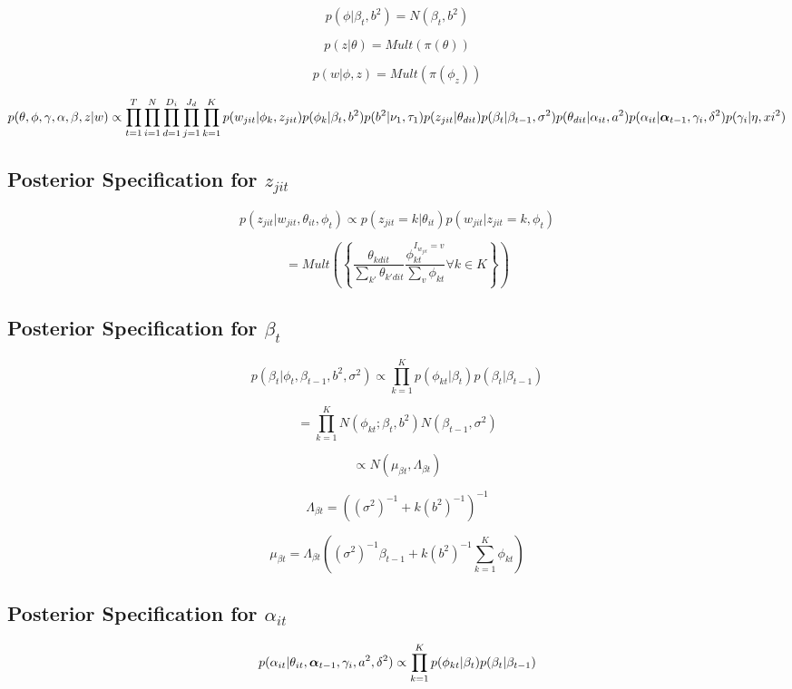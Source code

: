 \documentclass[a4paper]{article}
\begin{document}
\[p(\phi | \beta_t, b^2) = N(\beta_t, b^2)\]

\[p(z| \theta) = Mult(\pi(\theta))\]

\[p(w | \phi, z) = Mult(\pi(\phi_z))\]

\[p(\theta, \phi, \gamma, \alpha, \beta, z | w) \propto \prod_{t=1}^T \prod_{i=1}^N \prod_{d=1}^{D_i} \prod_{j=1}^{J_d} \prod_{k=1}^K p(w_{jit} | \phi_k, z_{jit}) p(\phi_k | \beta_t, b^2) p(b^2 | \nu_1, \tau_1) p(z_{jit} | \theta_{dit}) p(\beta_t | \beta_{t-1}, \sigma^2) p(\theta_{dit} | \alpha_{it}, a^2) p(\alpha_{it} | \text{\boldmath$\alpha$}_{t-1}, \gamma_i, \delta^2) p(\gamma_i | \eta, xi^2)\]

\subsection{Posterior Specification for $z_{jit}$}

\[p(z_{jit} | w_{jit}, \theta_{it}, \phi_t) \propto p(z_{jit} = k | \theta_{it}) p(w_{jit} | z_{jit} = k, \phi_t)\]

\[= Mult\left(\left\{\frac{\theta_{kdit}}{\sum_{k'} \theta_{k'dit}}\frac{\phi_{kt}^{I_{w_{jit}}=v}}{\sum_v \phi_{kt}} \forall k \in K \right\}\right)\]

\subsection{Posterior Specification for $\beta_t$}

\[p(\beta_t | \phi_t, \beta_{t-1}, b^2, \sigma^2) \propto \prod_{k=1}^K p(\phi_{kt} | \beta_t) p(\beta_t | \beta_{t-1})\]

\[= \prod_{k=1}^K N(\phi_{kt};\beta_t, b^2) N(\beta_{t-1}, \sigma^2)\]

\[\propto N(\mu_{\beta t}, \Lambda_{\beta t})\]

\[\Lambda_{\beta t} = ((\sigma^2)^{-1} + k (b^2)^{-1})^{-1}\]

\[\mu_{\beta t} = \Lambda_{\beta t} \left((\sigma^2)^{-1}\beta_{t-1} + k (b^2)^{-1} \sum_{k=1}^K \phi_{kt}\right) \]

\subsection{Posterior Specification for $\alpha_{it}$}

\[p(\alpha_{it} | \theta_{it}, \text{\boldmath$\alpha$}_{t-1}, \gamma_i, a^2, \delta^2) \propto \prod_{k=1}^K p(\phi_{kt} | \beta_t) p(\beta_t | \beta_{t-1})\]
\end{document}
